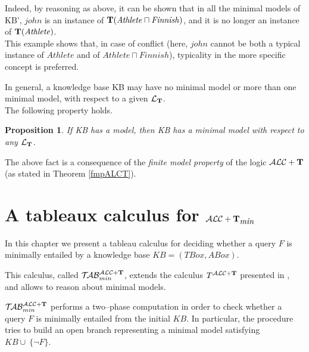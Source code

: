 \documentclass[a4paper, 11pt, oneside]{duthesis}
\newcommand{\tip}{{\bf T}}
\newcommand{\alct}{\mathcal{ALC}+\tip}
\newcommand{\alctmin}{\mathcal{ALC}+\tip_{\mbox{\em min}}}
\newcommand{\unione} {\cup}
\newcommand{\nott} {\lnot}
\newcommand{\mint}{\sqcap}
\newcommand{\ellet} {\mathcal{L}_{\bf T}}
\newcommand{\nuovoc}{\mathrel{{\mathcal{T}\!\mathcal{AB}}}_{min}^{\mathcal{ALC}+\mbox{\scriptsize $\tip$}}}
\newcommand{\calcolo}{T^{\mathcal{ALC}+\mbox{\scriptsize $\tip$}}}
\newtheorem{proposition}{Proposition}
\newcounter{posu}
\newtheorem{proposition}[posu]{Proposition}
\begin{document}
Indeed, by reasoning as above, it can be shown that in all the minimal models of KB', $\mathit{john}$ is an instance of $\tip(\mathit{Athlete} \mint \mathit{Finnish})$, and it is no longer an instance of $\tip(\mathit{Athlete})$.\\

This example shows that, in case of conflict (here, $\mathit{john}$ cannot be both a typical instance of $\mathit{Athlete}$ and of $\mathit{Athlete} \mint \mathit{Finnish}$), typicality in the more specific concept is preferred.


\vspace{0.35cm}

\noindent In general, a knowledge base KB may have no minimal model or more than one minimal model, with respect to a given $\ellet$.\\

The following property holds.

\begin{proposition}\label{proprModMinimali1}
If \emph{KB} has a model, then \emph{KB} has a minimal model with respect to any $\ellet$.
\end{proposition}

The above fact is a consequence of the \emph{finite model property} of the logic $\alct$ (as stated in Theorem \ref{fmpALCT}).




\chapter{A tableaux calculus for $\alctmin$}\label{tab}

In this chapter we present a tableau calculus for deciding whether a query $F$ is minimally entailed by a knowledge base $KB=(TBox,ABox)$.

This calculus, called $\nuovoc$, extends the calculus $\calcolo$ presented in \cite{FI09}, and allows to reason about minimal models.

$\nuovoc$ performs a two--phase computation in order to check whether a query $F$ is minimally entailed from the initial $KB$.
In particular, the procedure tries to build an open branch representing a minimal model satisfying $KB \unione \ \{\nott F\}$.\\
\end{document}
